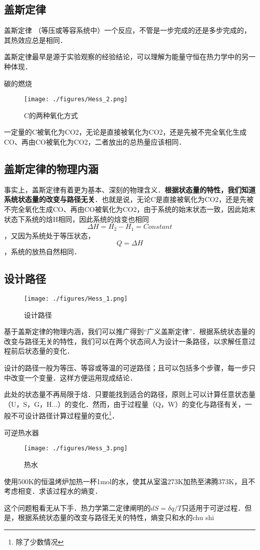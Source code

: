 
\subsection{盖斯定律}
\begin{theorem}{盖斯定律}
（等压或等容系统中）一个反应，不管是一步完成的还是多步完成的，其热效应总是相同．
\end{theorem}
盖斯定律最早是源于实验观察的经验结论，可以理解为能量守恒在热力学中的另一种体现．

\begin{example}{碳的燃烧}
\begin{figure}[ht]
\centering
\texttt{[image: ./figures/Hess\_2.png]}
\caption{C的两种氧化方式} \label{Hess_fig2}
\end{figure}
一定量的C被氧化为CO2，无论是直接被氧化为CO2，还是先被不完全氧化生成CO、再由CO被氧化为CO2，二者放出的总热量应该相同．
\end{example}

\subsection{盖斯定律的物理内涵}
事实上，盖斯定律有着更为基本、深刻的物理含义．\textbf{根据状态量的特性，我们知道系统状态量的改变与路径无关}．也就是说，无论C是直接被氧化为CO2，还是先被不完全氧化生成CO、再由CO被氧化为CO2，由于系统的始末状态一致，因此始末状态下系统的焓H相同，因此系统的焓变也相同$$\Delta H=H_2-H_1=Constant$$，又因为系统处于等压状态，$$Q=\Delta H$$，系统的放热自然相同．

\subsection{设计路径}
\begin{figure}[ht]
\centering
\texttt{[image: ./figures/Hess\_1.png]}
\caption{设计路径} \label{Hess_fig1}
\end{figure}

基于盖斯定律的物理内涵，我们可以推广得到“广义盖斯定律”．根据系统状态量的改变与路径无关的特性，我们可以在两个状态间人为设计一条路径，以求解任意过程前后状态量的变化．

设计的路径一般为等压、等容或等温的可逆路径；且可以包括多个步骤，每一步只中改变一个变量．这样方便运用现成结论．

此处的状态量不再局限于焓．只要能找到适合的路径，原则上可以计算任意状态量（U，S，G，H...）的变化．然而，由于过程量（Q，W）的变化与路径有关，一般不可设计路径计算过程量的变化\footnote{除了少数情况}．

\begin{example}{可逆热水器}
\begin{figure}[ht]
\centering
\texttt{[image: ./figures/Hess\_3.png]}
\caption{热水} \label{Hess_fig3}
\end{figure}
使用500K的恒温烤炉加热一杯1mol的水，使其从室温273K加热至沸腾373K，且不考虑相变．求该过程水的熵变．

这个问题粗看无从下手．热力学第二定律阐明的$dS=\delta q/T$只适用于可逆过程．但是，根据系统状态量的改变与路径无关的特性，熵变只和水的chu shi
\end{example}